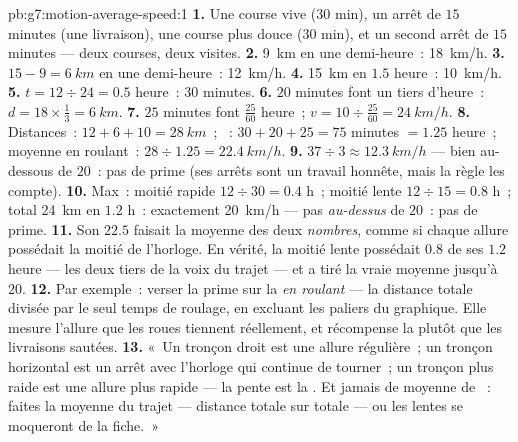 \begin{solution}{pb:g7:motion-average-speed:1}
\textbf{1.} Une course vive ($30$ min), un arrêt de $15$ minutes (une
livraison), une course plus douce ($30$ min), et un second arrêt de
$15$ minutes --- deux courses, deux visites.
\textbf{2.} \qty{9}{km} en une demi-heure~: \qty{18}{km/h}.
\textbf{3.} $15 - 9 = \qty{6}{km}$ en une demi-heure~:
\qty{12}{km/h}.
\textbf{4.} \qty{15}{km} en $1.5$ heure~: \qty{10}{km/h}.
\textbf{5.} $t = 12 \div 24 = 0.5$ heure~: $30$ minutes.
\textbf{6.} $20$ minutes font un tiers d'heure~:
$d = 18 \times \tfrac{1}{3} = \qty{6}{km}$.
\textbf{7.} $25$ minutes font $\tfrac{25}{60}$ heure~;
$v = 10 \div \tfrac{25}{60} = \qty{24}{km/h}$.
\textbf{8.} Distances~: $12 + 6 + 10 = \qty{28}{km}$~; ~:
$30 + 20 + 25 = 75$ minutes $= 1.25$ heure~; moyenne en roulant~:
$28 \div 1.25 = \qty{22.4}{km/h}$.
\textbf{9.} $37 \div 3 \approx \qty{12.3}{km/h}$ --- bien au-dessous
de $20$~: pas de prime (ses arrêts sont un travail honnête, mais la
règle les compte).
\textbf{10.} Max~: moitié rapide $12 \div 30 = 0.4$ h~; moitié lente
$12 \div 15 = 0.8$ h~; total \qty{24}{km} en $1.2$ h~: exactement
\qty{20}{km/h} --- pas \emph{au-dessus} de $20$~: pas de prime.
\textbf{11.} Son $22.5$ faisait la moyenne des deux \emph{nombres},
comme si chaque allure possédait la moitié de l'horloge. En vérité,
la moitié lente possédait $0.8$ de ses $1.2$ heure --- les deux tiers
de la voix du trajet --- et a tiré la vraie moyenne jusqu'à $20$.
\textbf{12.} Par exemple~: verser la prime sur la 
\emph{en roulant} --- la distance totale divisée par le seul temps de
roulage, en excluant les paliers du graphique. Elle mesure l'allure
que les roues tiennent réellement, et récompense la  plutôt
que les livraisons sautées.
\textbf{13.} «~Un tronçon droit est une allure régulière~; un tronçon
horizontal est un arrêt avec l'horloge qui continue de tourner~; un
tronçon plus raide est une allure plus rapide --- la pente est la
. Et jamais de moyenne de ~: faites la moyenne du
trajet --- distance totale sur  totale --- ou les  lentes
se moqueront de la fiche.~»
\end{solution}
